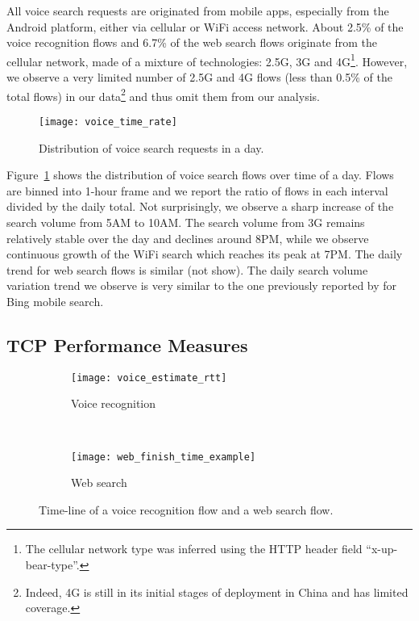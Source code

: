 All voice search requests are originated from mobile apps, especially from the Android platform, either via cellular or WiFi access network. About 2.5\% of the voice recognition flows and 6.7\% of the web search flows originate from the cellular network, made of a mixture of technologies: 2.5G, 3G and 4G\footnote{The cellular network type was inferred using the HTTP header field ``x-up-bear-type''.}. However, we observe a very limited number of 2.5G and 4G flows (less than 0.5\% of the total flows) in our data\footnote{Indeed, 4G is still in its initial stages of deployment in China and has limited coverage.} and thus omit them from our analysis.

\begin{figure}[t]
\centering
\texttt{[image: voice\_time\_rate]}
\caption{Distribution of voice search requests in a day.}
\label{fig:voice_time_rate}
\minsqueeze
\end{figure}

Figure~\ref{fig:voice_time_rate} shows the distribution of voice search flows over time of a day. Flows are binned into 1-hour frame and we report the ratio of flows in each interval divided by the daily total. Not surprisingly, we observe a sharp increase of the search volume from 5AM to 10AM. The search volume from 3G remains relatively stable over the day and declines around 8PM, while we observe continuous growth of the WiFi search which reaches its peak at 7PM. The daily trend for web search flows is similar (not show). The daily search volume variation trend we observe is very similar to the one previously reported by \cite{Song:2013:EEU:2488388.2488493} for Bing mobile search.

\subsection{TCP Performance Measures}

\begin{figure}[ht]
\centering
\begin{subfigure}[b]{0.6\linewidth}
	\texttt{[image: voice\_estimate\_rtt]}
\caption{Voice recognition}
\label{fig:voice_estimate_rtt}
\end{subfigure} \\
\begin{subfigure}[b]{0.6\linewidth}
	\texttt{[image: web\_finish\_time\_example]}
\caption{Web search}
\label{fig:web_finish_time_example}
\end{subfigure}
\caption{Time-line of a voice recognition flow and a web search flow.}
\label{fig:time_line}
\minsqueeze
\end{figure}

